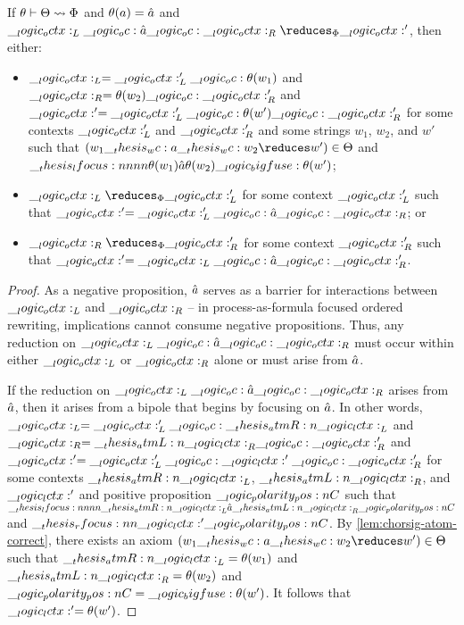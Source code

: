 \begin{theorem}\label{thm:formula-as-process:choreograph-soundness}
  If $\theta \vdash \Theta \rightsquigarrow \Phi$ and $\theta(a) = \hat{a}$ and $\octx_L \oc \defp{a} \oc \octx_R \reduces_{\orsig} \octx'$, then either:
  \begin{itemize}
  \item $\__logic_octx:_L = \__logic_octx:'_L \__logic_oc: \theta(w_1)$ and $\__logic_octx:_R = \theta(w_2) \__logic_oc: \__logic_octx:'_R$ and $\__logic_octx:' = \__logic_octx:'_L \__logic_oc: \theta(w') \__logic_oc: \__logic_octx:'_R$ for some contexts $\__logic_octx:'_L$ and $\__logic_octx:'_R$ and some strings $w_1$, $w_2$, and $w'$ such that $(w_1 \wc a \wc w_2 \reduces w') \in \srsig$ and $\__thesis_lfocus:nnnn {\theta(w_1)} {\hat{a}} {\theta(w_2)} {\__logic_bigfuse: \theta(w')}$;
  \item $\octx_L \reduces_{\orsig} \octx'_L$ for some context $\__logic_octx:'_L$ such that $\__logic_octx:' = \__logic_octx:'_L \__logic_oc: \hat{a} \__logic_oc: \__logic_octx:_R$; or
  \item $\octx_R \reduces_{\orsig} \octx'_R$ for some context $\__logic_octx:'_R$ such that $\__logic_octx:' = \__logic_octx:_L \__logic_oc: \hat{a} \__logic_oc: \__logic_octx:'_R$.
  \end{itemize}
\end{theorem}
\begin{proof}
  As a negative proposition, $\hat{a}$ serves as a barrier for interactions between $\__logic_octx:_L$ and $\__logic_octx:_R$ -- in process-as-formula focused ordered rewriting, implications cannot consume negative propositions.
  Thus, any reduction on $\__logic_octx:_L \__logic_oc: \hat{a} \__logic_oc: \__logic_octx:_R$ must occur within either $\__logic_octx:_L$ or $\__logic_octx:_R$ alone or must arise from $\hat{a}$.

  If the reduction on $\__logic_octx:_L \__logic_oc: \hat{a} \__logic_oc: \__logic_octx:_R$ arises from $\hat{a}$, then it arises from a bipole that begins by focusing on $\hat{a}$.
  In other words, $\__logic_octx:_L = \__logic_octx:'_L \__logic_oc: \__thesis_atmR:n {\__logic_lctx:}_L$ and $\__logic_octx:_R = \__thesis_atmL:n {\__logic_lctx:}_R \__logic_oc: \__logic_octx:'_R$ and $\__logic_octx:' = \__logic_octx:'_L \__logic_oc: \__logic_lctx:' \__logic_oc: \__logic_octx:'_R$ for some contexts $\__thesis_atmR:n {\__logic_lctx:}_L$, $\__thesis_atmL:n {\__logic_lctx:}_R$, and $\__logic_lctx:'$ and positive proposition $\__logic_polarity_pos:n {C}$ such that $\__thesis_lfocus:nnnn {\__thesis_atmR:n {\__logic_lctx:}_L} {\hat{a}} {\__thesis_atmL:n {\__logic_lctx:}_R} {\__logic_polarity_pos:n {C}}$ and $\__thesis_rfocus:nn {\__logic_lctx:'} {\__logic_polarity_pos:n {C}}$.
  By \cref{lem:chorsig-atom-correct}, there exists an axiom $(w_1 \wc a \wc w_2 \reduces w') \in \srsig$ such that $\__thesis_atmR:n {\__logic_lctx:}_L = \theta(w_1)$ and $\__thesis_atmL:n {\__logic_lctx:}_R = \theta(w_2)$ and $\__logic_polarity_pos:n {C} = \__logic_bigfuse: \theta(w')$.
  It follows that $\__logic_lctx:' = \theta(w')$.
\end{proof}

